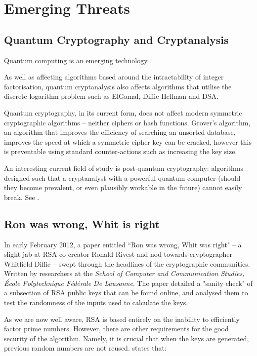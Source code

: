 \section{Emerging Threats}

  \subsection{Quantum Cryptography and Cryptanalysis}
  
    Quantum computing is an emerging technology.
    
    
    As well as affecting algorithms based around the intractability of integer factorisation, quantum cryptanalysis also affects algorithms that utilise the discrete logarithm problem such as ElGamal, Diffie-Hellman and DSA.
    
    Quantum cryptography, in its current form, does not affect modern symmetric cryptographic algorithms -- neither ciphers or hash functions. Grover's algorithm, an algorithm that improves the efficiency of searching an unsorted database, improves the speed at which a symmetric cipher key can be cracked, however this is preventable using standard counter-actions such as increasing the key size. 
    
    An interesting current field of study is post-quantum cryptography: algorithms designed such that a cryptanalyst with a powerful quantum computer (should they become prevalent, or even plausibly workable in the future) cannot easily break. See \cite{Bernstein:2009aa}.
  
  \subsection{Ron was wrong, Whit is right}
  
    In early February 2012, a paper entitled ``Ron was wrong, Whit was right" -- a slight jab at RSA co-creator Ronald Rivest and nod towards cryptographer Whitfield Diffie -- swept through the headlines of the cryptographic communities. Written by researchers at the \emph{School of Computer and Communication Studies, \'{E}cole Polytechnique F\'{e}d\'{e}rale De Lausanne}. The paper detailed a "sanity check" of a subsection of RSA public keys that can be found online, and analysed them to test the randomness of the inputs used to calculate the keys.
    
    As we are now well aware, RSA is based entirely on the inability to efficiently factor prime numbers. However, there are other requirements for the good security of the algorithm. Namely, it is crucial that when the keys are generated, previous random numbers are not reused. \cite{Loebenberger:2011aa} states that: 
    
